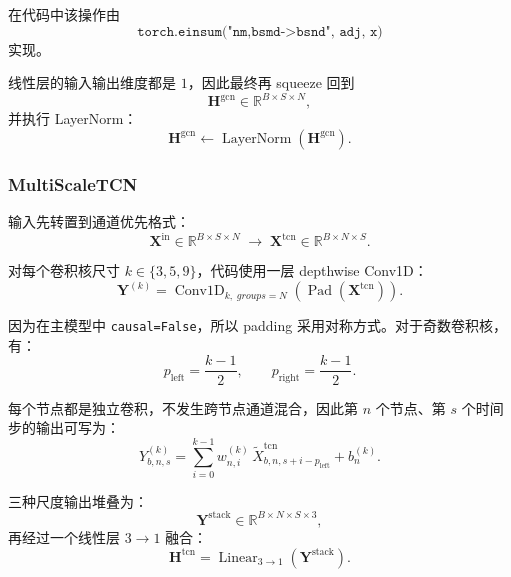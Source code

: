 \documentclass[UTF8]{ctexart}
\begin{document}
在代码中该操作由
\begin{equation}
    \texttt{torch.einsum("nm,bsmd->bsnd", adj, x)}
\end{equation}
实现。

线性层的输入输出维度都是 $1$，因此最终再 squeeze 回到
\begin{equation}
    \bm{H}^{\text{gcn}} \in \mathbb{R}^{B \times S \times N},
\end{equation}
并执行 LayerNorm：
\begin{equation}
    \bm{H}^{\text{gcn}} \leftarrow \operatorname{LayerNorm}(\bm{H}^{\text{gcn}}).
\end{equation}

\subsubsection{MultiScaleTCN}

输入先转置到通道优先格式：
\begin{equation}
    \bm{X}^{\text{in}} \in \mathbb{R}^{B \times S \times N}
    \;\longrightarrow\;
    \bm{X}^{\text{tcn}} \in \mathbb{R}^{B \times N \times S}.
\end{equation}

对每个卷积核尺寸 $k \in \{3,5,9\}$，代码使用一层 depthwise Conv1D：
\begin{equation}
    \bm{Y}^{(k)} = \operatorname{Conv1D}_{k,\;groups=N}(\operatorname{Pad}(\bm{X}^{\text{tcn}})).
\end{equation}

因为在主模型中 \texttt{causal=False}，所以 padding 采用对称方式。对于奇数卷积核，有：
\begin{equation}
    p_{\text{left}} = \frac{k-1}{2}, \qquad
    p_{\text{right}} = \frac{k-1}{2}.
\end{equation}

每个节点都是独立卷积，不发生跨节点通道混合，因此第 $n$ 个节点、第 $s$ 个时间步的输出可写为：
\begin{equation}
    Y^{(k)}_{b,n,s}
    =
    \sum_{i=0}^{k-1} w^{(k)}_{n,i}\,\tilde{X}^{\text{tcn}}_{b,n,s+i-p_{\text{left}}}
    + b^{(k)}_n.
\end{equation}

三种尺度输出堆叠为：
\begin{equation}
    \bm{Y}^{\text{stack}} \in \mathbb{R}^{B \times N \times S \times 3},
\end{equation}
再经过一个线性层 $3 \rightarrow 1$ 融合：
\begin{equation}
    \bm{H}^{\text{tcn}} = \operatorname{Linear}_{3\rightarrow 1}(\bm{Y}^{\text{stack}}).
\end{equation}
\end{document}
